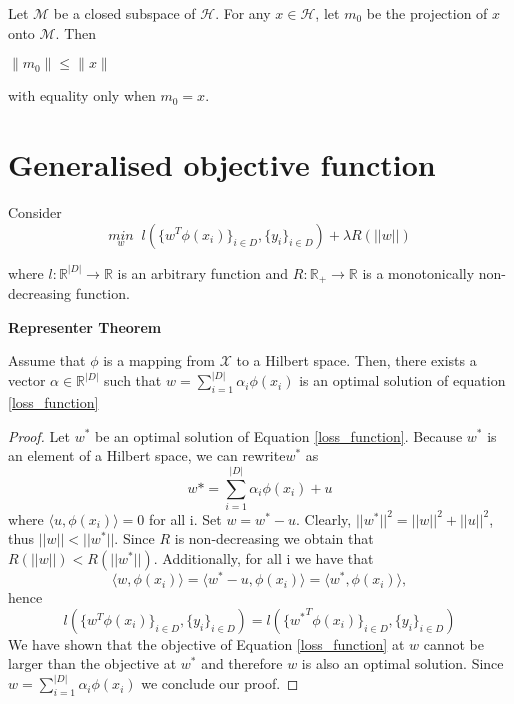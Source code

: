 \documentclass[12pt]{article}
\begin{document}
\begin{theorem}
 Let $\mathcal{M}$ be a closed subspace of $\mathcal{H}$. For any $x\in\mathcal{H}$, let $m_0$ be the projection of $x$ onto $\mathcal{M}$. Then 
 \begin{center}
     $\|m_0\|\leq\|x\|$
 \end{center}
 with equality only when $m_0=x$.
\end{theorem}



\section{Generalised objective function}
Consider 
\begin{equation}
    \label{loss_function}
    \underset{w}{min} \; \; l (\{w^{T}\phi(x_{i})\}_{i \in D}, \{y_{i}\}_{i \in D} ) + \lambda R(||w||)
\end{equation}

where $l : \mathbb{R}^{|D|} \rightarrow \mathbb{R}$ is an arbitrary function and $R : \mathbb{R}_{+} \rightarrow \mathbb{R}$ is a monotonically non-decreasing function.

\begin{theorem}{\textbf{Representer Theorem}} 

Assume that $\phi$ is a mapping from $\mathcal{X}$ to a Hilbert space. Then, there exists a vector $\alpha \in \mathbb{R}^{|D|}$
such that $w = \sum_{i = 1}^{|D|} \alpha_{i} \phi(x_{i})$ is an optimal solution of equation \ref{loss_function} 
\end{theorem}
\begin{proof}
Let $w^{*}$ be an optimal solution of Equation \ref{loss_function}. Because $w^{*}$  is an
element of a Hilbert space, we can rewrite$w^{*}$  as
\[w* = \sum_{i=1}^{|D|} \alpha_{i} \phi(x_{i}) + u\]
where $\langle u, \phi(x_i) \rangle = 0$ for all i. Set $w = w^{*} - u$. Clearly, $||w^{*}||^{2} = ||w||^{2}+ ||u||^{2} $,
thus $||w|| < ||w^{*}||$. Since $R$ is non-decreasing we obtain that $R(||w||) < R(||w^{*}||)$.
Additionally, for all i we have that
\[\langle w, \phi(x_i) \rangle = \langle w^{*} - u, \phi(x_i ) \rangle = \langle w^{*} , \phi(x_i ) \rangle,\] 
hence
\[l (\{w^{T}\phi(x_{i})\}_{i \in D}, \{y_{i}\}_{i \in D} ) = l (\{{w^{*}}^{T}\phi(x_{i})\}_{i \in D}, \{y_{i}\}_{i \in D} )\]
We have shown that the objective of Equation \ref{loss_function} at $w$ cannot be larger
than the objective at $w^{*}$ and therefore $w$ is also an optimal solution. Since
$w = \sum_{i=1}^{|D|} \alpha_i \phi(x_i)$ we conclude our proof.
\end{proof}
\end{document}
